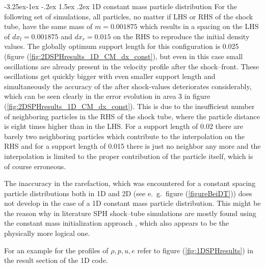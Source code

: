 \documentclass{report}
\makeatletter
\renewcommand\paragraph{\@startsection{paragraph}{4}{\z@}%
  {-3.25ex\@plus -1ex \@minus -.2ex}%
  {1.5ex \@plus .2ex}%
  {\normalfont\normalsize\bfseries}}
\makeatother
\begin{document}
   
\paragraph{1D constant mass particle distribution}
For the following set of simulations, all particles, no matter if LHS or RHS of the shock tube, have the same mass of $m=0.001875$ which results in a spacing on the LHS of $dx_l=0.001875$ and $dx_r=0.015$ on the RHS to reproduce the initial density values. 
The globally optimum support length for this configuration is 0.025 (figure (\ref{fig:2DSPHresults_1D_CM_dx_const}), but even in this case small oscillations are already present in the velocity profile after the shock--front. These oscillations get quickly bigger with even smaller support length and simultaneously the accuracy of the after shock-values deteriorates considerably, which can be seen clearly in the error evolution in area 3 in figure (\ref{fig:2DSPHresults_1D_CM_dx_const}). 
This is due to the insufficient number of neighboring particles in the RHS of the shock tube, where the particle distance is eight times higher than in the LHS. For a support length of 0.02 there are barely two neighboring particles which contribute to the interpolation on the RHS and for a support length of 0.015 there is just no neighbor any more and the interpolation is limited to the proper contribution of the particle itself, which is of course erroneous. 

The inaccuracy in the rarefaction, which was encountered for a constant spacing particle distributions both in 1D and 2D (see e.\ g.\ figure (\ref{figureBeiDT})) does not develop in the case of a 1D constant mass particle distribution. This might be the reason why 
in literature SPH shock--tube simulations are mostly found using the constant mass initialization approach \cite{Monaghan1983,Monaghan2005,Liu2003}, which also appears to be the physically more logical one.

For an example for the profiles of $\rho, p, u, e$ refer to figure (\ref{fig:1DSPHresults}) in the result section of the 1D code. 
\end{document}
